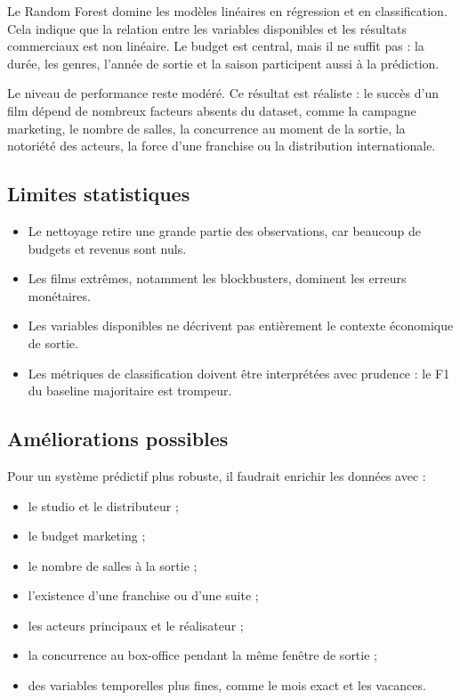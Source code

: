 \documentclass[11pt,a4paper]{article}
\begin{document}
Le Random Forest domine les modèles linéaires en régression et en classification. Cela indique que la relation entre les variables disponibles et les résultats commerciaux est non linéaire. Le budget est central, mais il ne suffit pas : la durée, les genres, l'année de sortie et la saison participent aussi à la prédiction.

Le niveau de performance reste modéré. Ce résultat est réaliste : le succès d'un film dépend de nombreux facteurs absents du dataset, comme la campagne marketing, le nombre de salles, la concurrence au moment de la sortie, la notoriété des acteurs, la force d'une franchise ou la distribution internationale.

\subsection{Limites statistiques}

\begin{itemize}
    \item Le nettoyage retire une grande partie des observations, car beaucoup de budgets et revenus sont nuls.
    \item Les films extrêmes, notamment les blockbusters, dominent les erreurs monétaires.
    \item Les variables disponibles ne décrivent pas entièrement le contexte économique de sortie.
    \item Les métriques de classification doivent être interprétées avec prudence : le F1 du baseline majoritaire est trompeur.
\end{itemize}

\subsection{Améliorations possibles}

Pour un système prédictif plus robuste, il faudrait enrichir les données avec :
\begin{itemize}
    \item le studio et le distributeur ;
    \item le budget marketing ;
    \item le nombre de salles à la sortie ;
    \item l'existence d'une franchise ou d'une suite ;
    \item les acteurs principaux et le réalisateur ;
    \item la concurrence au box-office pendant la même fenêtre de sortie ;
    \item des variables temporelles plus fines, comme le mois exact et les vacances.
\end{itemize}
\end{document}

